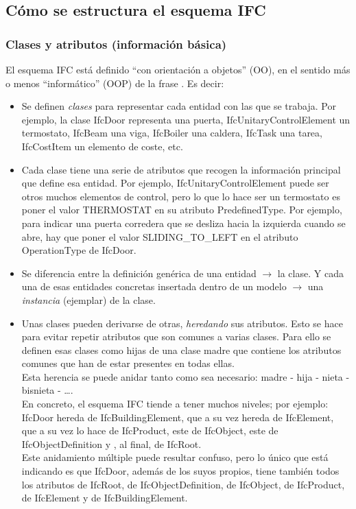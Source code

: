 \documentclass[spanish,10pt,a4paper,final,oneside]{article}
\begin{document}
\subsection{Cómo se estructura el esquema IFC}

\subsubsection{Clases y atributos (información básica)}

El esquema IFC está definido ``con orientación a objetos'' (OO), en el sentido más o menos ``informático'' (OOP) de la frase . Es decir:
\begin{itemize}
\item Se definen \textit{clases} para representar cada entidad con las que se trabaja. Por ejemplo, la clase IfcDoor representa una puerta, IfcUnitaryControlElement un termostato, IfcBeam una viga, IfcBoiler una caldera, IfcTask una tarea, IfcCostItem un elemento de coste, etc.
\item Cada clase tiene una serie de atributos que recogen la información principal que define esa entidad. Por ejemplo, IfcUnitaryControlElement puede ser otros muchos elementos de control, pero lo que lo hace ser un termostato es poner el valor THERMOSTAT en su atributo PredefinedType. Por ejemplo, para indicar una puerta corredera que se desliza hacia la izquierda cuando se abre, hay que poner el valor SLIDING\_TO\_LEFT en el atributo OperationType de IfcDoor.

\item Se diferencia entre la definición genérica de una entidad $\rightarrow$ la clase. Y cada una de esas entidades concretas insertada dentro de un modelo $\rightarrow$ una \textit{instancia} (ejemplar) de la clase.

\item Unas clases pueden derivarse de otras, \textit{heredando} sus atributos. Esto se hace para evitar repetir atributos que son comunes a varias clases. Para ello se definen esas clases como hijas de una clase madre que contiene los atributos comunes que han de estar presentes en todas ellas.
\\Esta herencia se puede anidar tanto como sea necesario: madre - hija - nieta - bisnieta - \ldots. 
\\En concreto, el esquema IFC tiende a tener muchos niveles; por ejemplo: IfcDoor hereda de IfcBuildingElement, que a su vez hereda de IfcElement, que a su vez lo hace de IfcProduct, este de IfcObject, este de IfcObjectDefinition y , al final, de IfcRoot.
\\Este anidamiento múltiple puede resultar confuso, pero lo único que está indicando es que IfcDoor, además de los suyos propios, tiene también todos los atributos de IfcRoot, de IfcObjectDefinition, de IfcObject, de IfcProduct, de IfcElement y de IfcBuildingElement.
\end{itemize}
\end{document}
